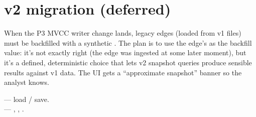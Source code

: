 \section{v2 migration (deferred)}

When the P3 MVCC writer change lands, legacy edges (loaded from
v1 files) must be backfilled with a synthetic .
The plan is to use the edge's  as the backfill
value: it's not exactly right (the edge was ingested at some later
moment), but it's a defined, deterministic choice that lets v2
snapshot queries produce sensible results against v1 data. The UI
gets a ``approximate snapshot'' banner so the analyst knows.

\begin{inthecode}
 --- load /
save.\\
 ---
, , .
\end{inthecode}
